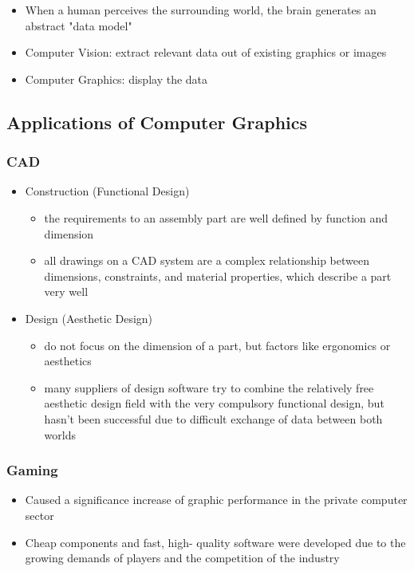\documentclass{standalone}
\begin{document}
\begin{itemize}
	\item When a human perceives the surrounding world, the brain generates an abstract "data model"
	\item Computer Vision: extract relevant data out of existing graphics or images
	\item Computer Graphics: display the data
\end{itemize}

\subsection{Applications of Computer Graphics}

\subsubsection*{CAD}

\begin{itemize}
	\item Construction (Functional Design)
	\begin{itemize}
		\item the requirements to an assembly part are well defined by function and dimension
		\item all drawings on a CAD system are a complex relationship between dimensions, constraints, and material properties, which describe a part very well
	\end{itemize}
	\item Design (Aesthetic Design)
	\begin{itemize}
		\item do not focus on the dimension of a part, but factors like ergonomics or aesthetics
		\item many suppliers of design software try to combine the relatively free aesthetic design field with the very compulsory functional design, but hasn't been successful due to difficult exchange of data between both worlds
	\end{itemize}
\end{itemize}

\subsubsection*{Gaming}
\begin{itemize}
	\item Caused a significance increase of graphic performance in the private computer sector
	\item Cheap components and fast, high- quality software were developed due to the growing demands of players and the competition of the industry
\end{itemize}
\end{document}
